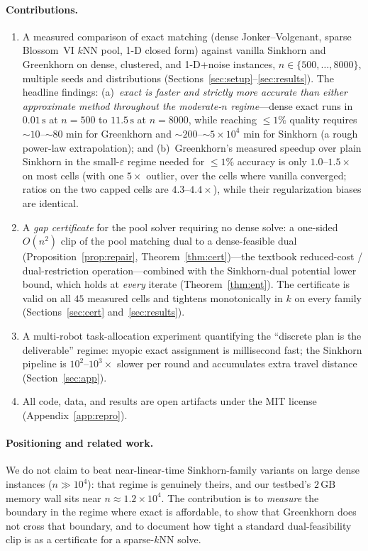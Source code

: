\documentclass[11pt]{article}
\theoremstyle{remark}
\begin{document}
\paragraph{Contributions.}
\begin{enumerate}[leftmargin=2em,itemsep=1pt]
\item A measured comparison of exact matching (dense Jonker--Volgenant,
  sparse Blossom~VI $k$NN pool, 1-D closed form) against vanilla Sinkhorn
  and Greenkhorn on dense, clustered, and 1-D+noise instances,
  $n\in\{500,\dots,8000\}$, multiple seeds and distributions
  (Sections~\ref{sec:setup}--\ref{sec:results}). The headline findings:
  (a)~\emph{exact is faster \emph{and} strictly more accurate than either
  approximate method throughout the moderate-$n$ regime}---dense exact runs
  in $0.01\,\mathrm{s}$ at $n=500$ to $11.5\,\mathrm{s}$ at $n=8000$,
  while reaching $\le 1\%$ quality requires $\sim\!10$--$\sim\!80$ min for
  Greenkhorn and $\sim\!200$--$\sim\!5{\times}10^4$ min for Sinkhorn (a
  rough power-law extrapolation); and (b)~Greenkhorn's measured speedup
  over plain Sinkhorn in the small-$\varepsilon$ regime needed for
  $\le 1\%$ accuracy is only $1.0$--$1.5\times$ on most cells (with one
  $5\times$ outlier, over the cells where vanilla converged; ratios on
  the two capped cells are $4.3$--$4.4\times$), while their regularization
  biases are identical.
\item A \emph{gap certificate} for the pool solver requiring no dense solve:
  a one-sided $O(n^2)$ clip of the pool matching dual to a dense-feasible
  dual (Proposition~\ref{prop:repair}, Theorem~\ref{thm:cert})---the
  textbook reduced-cost / dual-restriction operation---combined with the
  Sinkhorn-dual potential lower bound, which holds at \emph{every} iterate
  (Theorem~\ref{thm:ent}). The certificate is valid on all $45$ measured
  cells and tightens monotonically in $k$ on every family
  (Sections~\ref{sec:cert} and~\ref{sec:results}).
\item A multi-robot task-allocation experiment quantifying the ``discrete
  plan is the deliverable'' regime: myopic exact assignment is millisecond
  fast; the Sinkhorn pipeline is $10^2$--$10^3\times$ slower per round and
  accumulates extra travel distance (Section~\ref{sec:app}).
\item All code, data, and results are open artifacts under the MIT license
  (Appendix~\ref{app:repro}).
\end{enumerate}

\paragraph{Positioning and related work.}
We do not claim to beat near-linear-time Sinkhorn-family variants on large
dense instances ($n\gg 10^4$): that regime is genuinely theirs, and our
testbed's $2\,\mathrm{GB}$ memory wall sits near $n\approx 1.2\times 10^4$.
The contribution is to \emph{measure} the boundary in the regime where
exact is affordable, to show that Greenkhorn does not cross that boundary,
and to document how tight a standard dual-feasibility clip is as a
certificate for a sparse-$k$NN solve.
\end{document}
